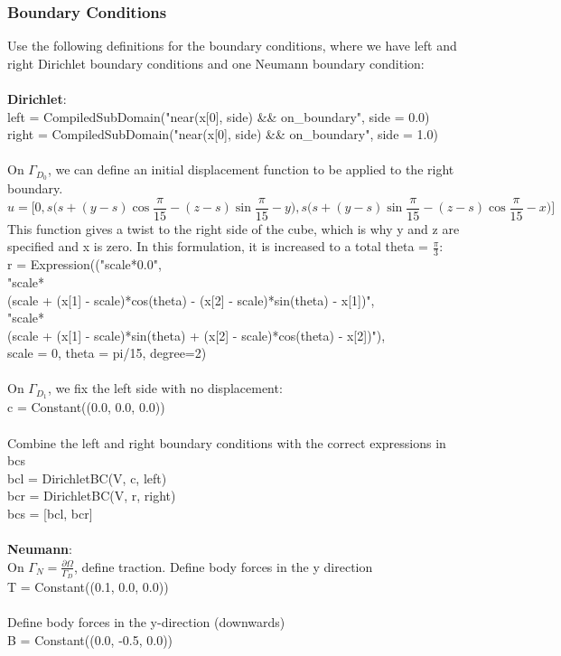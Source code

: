 \documentclass[12pt,3p]{article}
\begin{document}
\subsubsection{Boundary Conditions}
Use the following definitions for the boundary conditions, where we have left and right Dirichlet boundary conditions and one Neumann boundary condition: \\ \\
\textbf{Dirichlet}: \\ 
{\selectfont
left =  CompiledSubDomain("near(x[0], side) \&\& on\_boundary", side = 0.0) \\
right = CompiledSubDomain("near(x[0], side) \&\& on\_boundary", side = 1.0) \\ \\
}
On $\Gamma_{D_0}$, we can define an initial displacement function to be applied to the right boundary.
\begin{equation*}
u = \bigg[ 0, s \bigg( s + (y - s) \cos \frac{\pi}{15} - (z - s) \sin \frac{\pi}{15} - y \bigg), s \bigg(s + (y - s) \sin \frac{\pi}{15} - (z - s) \cos \frac{\pi}{15} - x \bigg) \bigg]
\end{equation*}
This function gives a twist to the right side of the cube, which is why y and z are specified and x is zero. In this formulation, it is increased to a total theta = $\frac{\pi}{3}$: \\
{\selectfont
r = Expression(("scale*0.0", \\
\indent "scale* \\
\indent (scale + (x[1] - scale)*cos(theta) - (x[2] - scale)*sin(theta) - x[1])", \\
\indent "scale* \\
\indent (scale + (x[1] - scale)*sin(theta) + (x[2] - scale)*cos(theta) - x[2])"), \\
\indent scale = 0, theta = pi/15, degree=2) \\ \\
}
On $\Gamma_{D_1}$, we fix the left side with no displacement: \\
{\selectfont
c = Constant((0.0, 0.0, 0.0)) \\ \\
}
Combine the left and right boundary conditions with the correct expressions in {\selectfont bcs } \\ 
{\selectfont
bcl = DirichletBC(V, c, left) \\
bcr = DirichletBC(V, r, right) \\
bcs = [bcl, bcr] \\ \\ 
}
\textbf{Neumann}: \\
On $\Gamma_N = \frac{\partial \Omega}{\Gamma_D}$, define traction. Define body forces in the y direction \\
{\selectfont
T  = Constant((0.1,  0.0, 0.0)) \\ \\
}
Define body forces in the y-direction (downwards) \\
{\selectfont
B  = Constant((0.0,  -0.5, 0.0)) 
}
\end{document}
